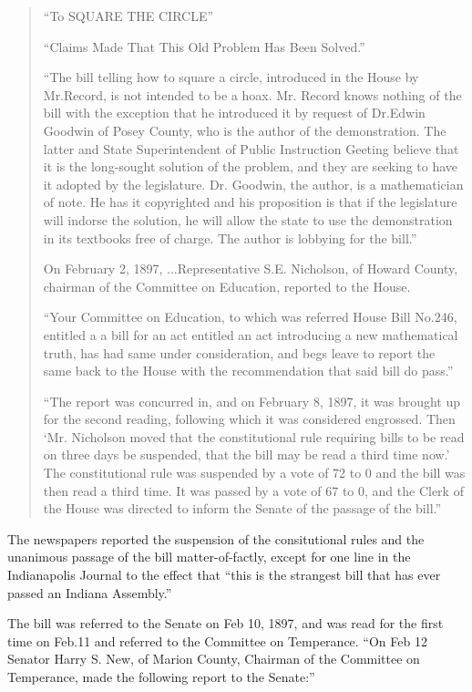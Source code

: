 \begin{quote}
  ``To SQUARE THE CIRCLE''

  ``Claims Made That This Old Problem Has Been Solved.''

  ``The bill telling how to square a circle, introduced in the House by
  Mr.Record, is not intended to be a hoax. Mr. Record knows nothing of
  the bill with the exception that he introduced it by request of
  Dr.Edwin Goodwin of Posey County, who is the author of the
  demonstration. The latter and State Superintendent of Public
  Instruction Geeting believe that it is the long-sought solution of the
  problem, and they are seeking to have it adopted by the
  legislature. Dr. Goodwin, the author, is a mathematician of note. He
  has it copyrighted and his proposition is that if the legislature will
  indorse the solution, he will allow the state to use the demonstration
  in its textbooks free of charge. The author is lobbying for the
  bill.''

  On February 2, 1897, ...Representative S.E. Nicholson, of Howard
  County, chairman of the Committee on Education, reported to the House.


  ``Your Committee on Education, to which was referred House Bill
  No.246, entitled a a bill for an act entitled an act introducing a new
  mathematical truth, has had same under consideration, and begs leave
  to report the same back to the House with the recommendation that said
  bill do pass.''

  ``The report was concurred in, and on February 8, 1897, it was brought
  up for the second reading, following which it was considered
  engrossed. Then `Mr. Nicholson moved that the constitutional rule
  requiring bills to be read on three days be suspended, that the bill
  may be read a third time now.' The constitutional rule was suspended
  by a vote of 72 to 0 and the bill was then read a third time. It was
  passed by a vote of 67 to 0, and the Clerk of the House was directed
  to inform the Senate of the passage of the bill.''
\end{quote}

The newspapers reported the suspension of the consitutional rules and
the unanimous passage of the bill matter-of-factly, except for one line
in the Indianapolis Journal to the effect that ``this is the strangest
bill that has ever passed an Indiana Assembly.''

The bill was referred to the Senate on Feb 10, 1897, and was read for
the first time on Feb.11 and referred to the Committee on
Temperance. ``On Feb 12 Senator Harry S. New, of Marion County, Chairman
of the Committee on Temperance, made the following report to the
Senate:''

